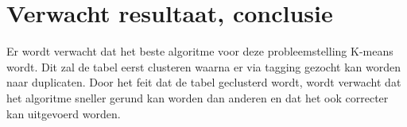 %
%
%
%
%

\section{Verwacht resultaat, conclusie}%
\label{sec:verwachte_resultaten}

Er wordt verwacht dat het beste algoritme voor deze probleemstelling K-means wordt. Dit zal de tabel eerst clusteren waarna er via tagging gezocht kan worden naar duplicaten. Door het feit dat de tabel geclusterd wordt, wordt verwacht dat het algoritme sneller gerund kan worden dan anderen en dat het ook correcter kan uitgevoerd worden.



%
%

